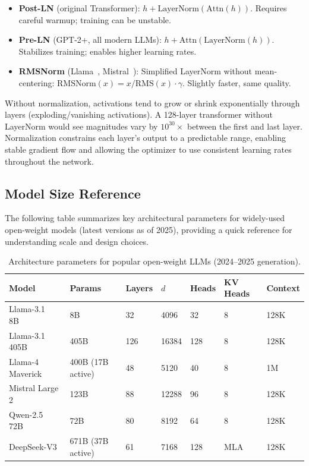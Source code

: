 \begin{keybox}
\begin{itemize}
  \item \textbf{Post-LN} (original Transformer): $h + \text{LayerNorm}(\text{Attn}(h))$. Requires careful warmup; training can be unstable.
  \item \textbf{Pre-LN} (GPT-2+, all modern LLMs): $h + \text{Attn}(\text{LayerNorm}(h))$. Stabilizes training; enables higher learning rates.
  \item \textbf{RMSNorm} (Llama~\cite{grattafiori2024llama3}, Mistral~\cite{jiang2023mistral}): Simplified LayerNorm without mean-centering: $\text{RMSNorm}(x) = x / \text{RMS}(x) \cdot \gamma$. Slightly faster, same quality.
\end{itemize}
\end{keybox}

\begin{intuitionbox}
Without normalization, activations tend to grow or shrink exponentially through layers (exploding/vanishing activations). A 128-layer transformer without LayerNorm would see magnitudes vary by $10^{30}\times$ between the first and last layer. Normalization constrains each layer’s output to a predictable range, enabling stable gradient flow and allowing the optimizer to use consistent learning rates throughout the network.
\end{intuitionbox}

\subsection{Model Size Reference}
\label{model-size-reference}

The following table summarizes key architectural parameters for widely-used open-weight models (latest versions as of 2025), providing a quick reference for understanding scale and design choices.

\begin{table}[ht!]
\centering
\caption{Architecture parameters for popular open-weight LLMs (2024--2025 generation).}
\begin{tabular}{@{}lp{1.8cm}p{1.8cm}p{1.8cm}p{1.8cm}p{1.8cm}p{1.8cm}@{}}
\toprule
\textbf{Model} & \textbf{Params} & \textbf{Layers} & \textbf{$d$} & \textbf{Heads} & \textbf{KV Heads} & \textbf{Context} \\
\midrule
Llama-3.1 8B~\cite{grattafiori2024llama3} & 8B & 32 & 4096 & 32 & 8 & 128K \\
Llama-3.1 405B~\cite{grattafiori2024llama3} & 405B & 126 & 16384 & 128 & 8 & 128K \\
Llama-4 Maverick~\cite{meta2025llama4} & 400B (17B active) & 48 & 5120 & 40 & 8 & 1M \\
Mistral Large 2~\cite{jiang2024mistrallarge2} & 123B & 88 & 12288 & 96 & 8 & 128K \\
Qwen-2.5 72B~\cite{qwen2024qwen25} & 72B & 80 & 8192 & 64 & 8 & 128K \\
DeepSeek-V3~\cite{deepseekv3} & 671B (37B active) & 61 & 7168 & 128 & MLA & 128K \\
\bottomrule
\end{tabular}
\end{table}

